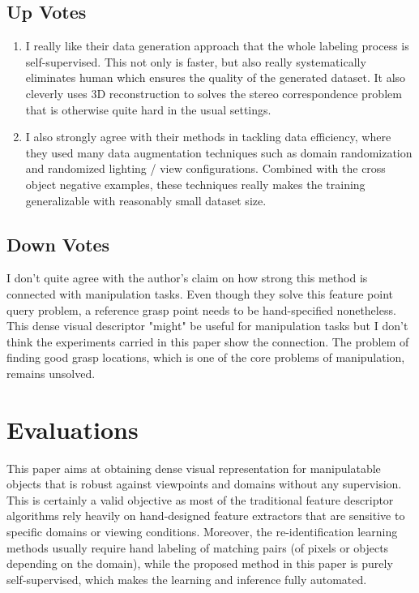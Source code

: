 \documentclass[10pt, twocolumn]{article}
\begin{document}
\subsection{Up Votes}
\begin{enumerate}
  \item I really like their data generation approach that the whole labeling process
    is self-supervised. This not only is faster, but also really systematically eliminates
    human which ensures the quality of the generated dataset. It also cleverly
    uses 3D reconstruction to solves the stereo correspondence problem that is
    otherwise quite hard in the usual settings.

  \item I also strongly agree with their methods in tackling data efficiency, where
    they used many data augmentation techniques such as domain randomization and
    randomized lighting / view configurations. Combined with the cross object
    negative examples, these techniques really makes the training generalizable
    with reasonably small dataset size.
\end{enumerate}

\subsection{Down Votes}
I don't quite agree with the author's claim on how strong this method is connected
with manipulation tasks. Even though they solve this feature point query problem,
a reference grasp point needs to be hand-specified nonetheless. This dense
visual descriptor "might" be useful for manipulation tasks but I don't think the
experiments carried in this paper show the connection. The problem of finding
good grasp locations, which is one of the core problems of manipulation, remains unsolved.

\section{Evaluations}
This paper aims at obtaining dense visual representation for manipulatable objects
that is robust against viewpoints and domains without any supervision.
This is certainly a valid objective as most of the
traditional feature descriptor algorithms rely heavily on hand-designed feature extractors
that are sensitive to specific domains or viewing conditions. Moreover, the
re-identification learning methods usually require hand labeling of matching
pairs (of pixels or objects depending on the domain), while the proposed method
in this paper is purely self-supervised, which makes the learning and inference
fully automated.
\end{document}
